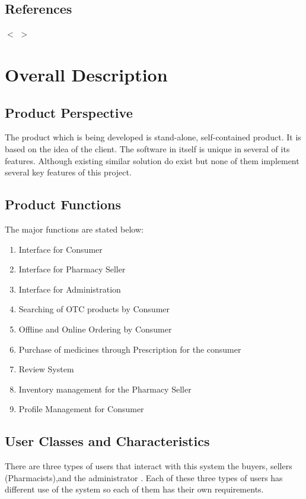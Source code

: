 \documentclass{scrreprt}
\begin{document}
\section{References}
$<$   $>$


\chapter{Overall Description}

\section{Product Perspective}
The product which is being developed is stand-alone, self-contained product. It is based on the idea of the client. The software in itself is unique in several of its features. Although existing similar solution do exist but none of them implement several key features of this project.

\section{Product Functions}
The major functions are stated below:
\begin{enumerate}
\item	Interface for Consumer
\item	Interface for Pharmacy Seller
\item	Interface for Administration
\item	Searching of OTC products by Consumer
\item	Offline and Online Ordering by Consumer
\item	Purchase of medicines through Prescription for the consumer
\item	Review System
\item	Inventory management for the Pharmacy Seller
\item	Profile Management for Consumer
\end{enumerate}

\section{User Classes and Characteristics}
There are three types of users that interact with this system the buyers, sellers (Pharmacists),and the administrator . Each of these three types of users has different use of the system so each of them has their own requirements.   \\
\end{document}
